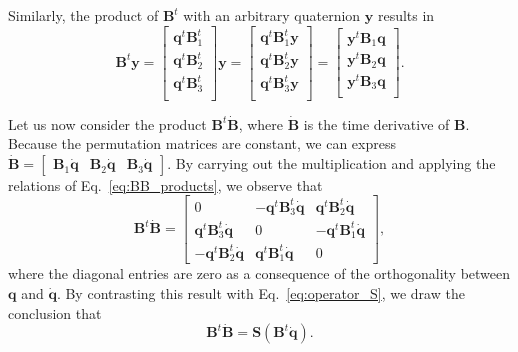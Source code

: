 \documentclass[aip,jcp,reprint,amsmath,amssymb,amsfont]{revtex4-1}
\newcommand{\mt}[1]{\boldsymbol{\mathbf{#1}}}           %
\newcommand{\vt}[1]{\boldsymbol{\mathbf{#1}}}           %
\newcommand{\tr}[1]{#1^t}                               %
\begin{document}
Similarly, the product of $\tr{\mt B}$ with an arbitrary quaternion $\vt y$ results in
\begin{equation}
\label{eq:vector_entries}
\tr{\mt B}\vt y =
\left[\begin{array}{c}
\tr{\vt q}\tr{\mt B}_1 \\
\tr{\vt q}\tr{\mt B}_2 \\
\tr{\vt q}\tr{\mt B}_3 \\
\end{array}\right]\vt y = 
\left[\begin{array}{c}
\tr{\vt q}\tr{\mt B}_1\vt y \\
\tr{\vt q}\tr{\mt B}_2\vt y \\
\tr{\vt q}\tr{\mt B}_3\vt y \\
\end{array}\right] = 
\left[\begin{array}{c}
\tr{\vt y}{\mt B}_1\vt q \\
\tr{\vt y}{\mt B}_2\vt q \\
\tr{\vt y}{\mt B}_3\vt q \\
\end{array}\right].
\end{equation}

Let us now consider the product $\tr{\mt B}\dot{\mt B}$, where $\dot{\mt B}$ is the time derivative of $\mt B$. Because the permutation matrices are constant, we can express $\dot{\mt B} = [\begin{array}{ccc}{\mt B}_1\dot{\vt q} & {\mt B}_2\dot{\vt q} & {\mt B}_3\dot{\vt q}\end{array}]$. By carrying out the multiplication and applying the relations of Eq.~\ref{eq:BB_products}, we observe that
\[
\tr{\mt B}\dot{\mt B} = \left[
\begin{array}{ccc}
0 & -\tr{\vt q} \tr{\mt B_3}\dot{\vt q} & \tr{\vt q} \tr{\mt B_2}\dot{\vt q} \\
\tr{\vt q} \tr{\mt B_3}\dot{\vt q} & 0 & -\tr{\vt q} \tr{\mt B_1}\dot{\vt q} \\
-\tr{\vt q} \tr{\mt B_2}\dot{\vt q} & \tr{\vt q} \tr{\mt B_1}\dot{\vt q}  & 0
\end{array}
\right],
\]
where the diagonal entries are zero as a consequence of the orthogonality between $\vt q$ and $\dot{\vt q}$. By contrasting this result with Eq.~\ref{eq:operator_S}, we draw the conclusion that
\begin{equation}
\label{eq:relation_B_qdot}
\tr{\mt B}\dot{\mt B} = {\mt S}\left( \tr{\mt B}\dot{\vt q} \right).
\end{equation}
\end{document}
